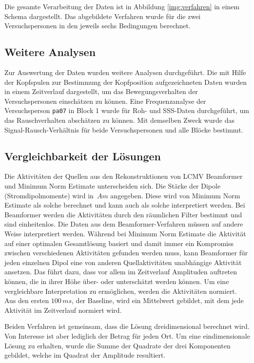 \documentclass[doc,a4paper,12pt]{apa6}
\begin{document}
Die gesamte Verarbeitung der Daten ist in Abbildung \ref{img:verfahren} in einem Schema dargestellt. Das abgebildete Verfahren wurde für die zwei Versuchspersonen in den jeweils sechs Bedingungen berechnet.

\subsection{Weitere Analysen}

Zur Auswertung der Daten wurden weitere Analysen durchgeführt. Die mit Hilfe der Kopfspulen zur Bestimmung der Kopfposition aufgezeichneten Daten wurden in einem Zeitverlauf dargestellt, um das Bewegungsverhalten der Versuchspersonen einschätzen zu können. Eine Frequenzanalyse der Versuchsperson \texttt{pa07} in Block 1 wurde für Roh- und SSS-Daten durchgeführt, um das Rauschverhalten abschätzen zu können. Mit demselben Zweck wurde das Signal-Rausch-Verhältnis für beide Versuchspersonen und alle Blöcke bestimmt.

\subsection{Vergleichbarkeit der Lösungen}
\label{sec:amplitud}

Die Aktivitäten der Quellen aus den Rekonstruktionen von LCMV Beamformer und Minimum Norm Estimate unterscheiden sich. Die Stärke der Dipole (Stromdipolmomente) wird in~$Am$ angegeben. Diese wird von Minimum Norm Estimate als solche berechnet und kann auch als solche interpretiert werden. Bei Beamformer werden die Aktivitäten durch den räumlichen Filter bestimmt und sind einheitenlos. Die Daten aus dem Beamformer-Verfahren müssen auf andere Weise interpretiert werden. Während bei Minimum Norm Estimate die Aktivität auf einer optimalen Gesamtlösung basiert und damit immer ein Kompromiss zwischen verschiedenen Aktivitäten gefunden werden muss, kann Beamformer für jeden einzelnen Dipol eine von anderen Quellaktivitäten unabhängige Aktivität ansetzen. Das führt dazu, dass vor allem im Zeitverlauf Amplituden auftreten können, die in ihrer Höhe über- oder unterschätzt werden können. Um eine vergleichbare Interpretation zu ermöglichen, werden die Aktivitäten normiert. Aus den ersten $100\,ms$, der Baseline, wird ein Mittelwert gebildet, mit dem jede Aktivität im Zeitverlauf normiert wird.

Beiden Verfahren ist gemeinsam, dass die Lösung dreidimensional berechnet wird. Von Interesse ist aber lediglich der Betrag für jeden Ort. Um eine eindimensionale Lösung zu erhalten, wurde die Summe der Quadrate der drei Komponenten gebildet, welche im Quadrat der Amplitude resultiert.
\end{document}
